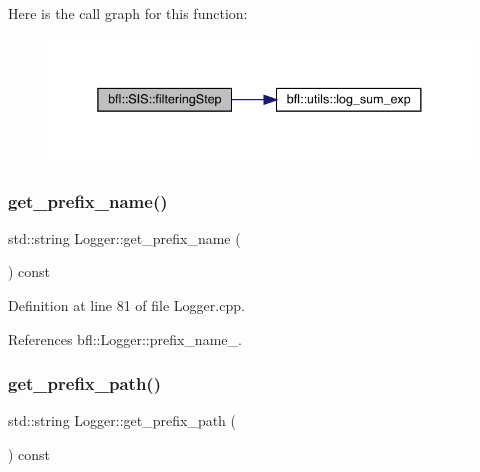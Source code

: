 Here is the call graph for this function\+:
\nopagebreak
\begin{figure}[H]
\begin{center}
\leavevmode
\includegraphics[width=338pt]{classbfl_1_1SIS_a582f06cc5456d2cc6ed8f90087cbbb4c_cgraph}
\end{center}
\end{figure}
\mbox{\label{classbfl_1_1Logger_a913a795b7bfbf378815eeb342d68a7c0}} 
\subsubsection{\texorpdfstring{get\+\_\+prefix\+\_\+name()}{get\_prefix\_name()}}
{\footnotesize\ttfamily std\+::string Logger\+::get\+\_\+prefix\+\_\+name (\begin{DoxyParamCaption}{ }\end{DoxyParamCaption}) const\hspace{0.3cm}{\ttfamily [inherited]}}



Definition at line 81 of file Logger.\+cpp.



References bfl\+::\+Logger\+::prefix\+\_\+name\+\_\+.

\mbox{\label{classbfl_1_1Logger_a56cf1a4e712bf23d9978420a8a59a62b}} 
\subsubsection{\texorpdfstring{get\+\_\+prefix\+\_\+path()}{get\_prefix\_path()}}
{\footnotesize\ttfamily std\+::string Logger\+::get\+\_\+prefix\+\_\+path (\begin{DoxyParamCaption}{ }\end{DoxyParamCaption}) const\hspace{0.3cm}{\ttfamily [inherited]}}



